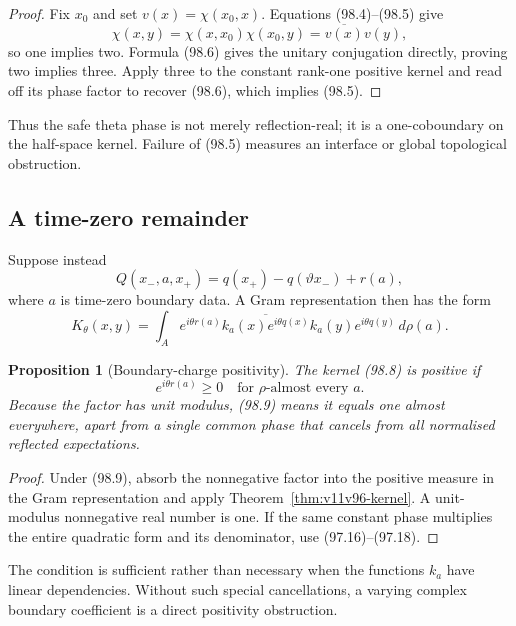 \documentclass[11pt]{article}
\newtheorem{proposition}[theorem]{Proposition}
\begin{document}
\begin{proof}
Fix \(x_0\) and set \(v(x)=\chi(x_0,x)\).  Equations
(98.4)--(98.5) give
\[
 \chi(x,y)=\chi(x,x_0)\chi(x_0,y)
          =\overline{v(x)}v(y),
\]
so one implies two.  Formula (98.6) gives the unitary conjugation
directly, proving two implies three.  Apply three to the constant
rank-one positive kernel and read off its phase factor to recover
(98.6), which implies (98.5).
\end{proof}

Thus the safe theta phase is not merely reflection-real; it is a
one-coboundary on the half-space kernel.  Failure of (98.5) measures
an interface or global topological obstruction.

\subsection{A time-zero remainder}

Suppose instead
\[
 Q(x_-,a,x_+)
 =q(x_+)-q(\vartheta x_-)+r(a),                              \tag{98.7}
\]
where \(a\) is time-zero boundary data.  A Gram representation then
has the form
\[
 K_\theta(x,y)
 =\int_A e^{i\theta r(a)}
        \overline{k_a(x)e^{i\theta q(x)}}
        k_a(y)e^{i\theta q(y)}\,d\rho(a).                   \tag{98.8}
\]

\begin{proposition}[Boundary-charge positivity]
\label{prop:v11v98-boundary}
The kernel (98.8) is positive if
\[
                              e^{i\theta r(a)}\ge0
                    \quad\text{for }\rho\text{-almost every }a.
                                                                    \tag{98.9}
\]
Because the factor has unit modulus, (98.9) means it equals one almost
everywhere, apart from a single common phase that cancels from all
normalised reflected expectations.
\end{proposition}

\begin{proof}
Under (98.9), absorb the nonnegative factor into the positive measure
in the Gram representation and apply
Theorem~\ref{thm:v11v96-kernel}.  A unit-modulus nonnegative real
number is one.  If the same constant phase multiplies the entire
quadratic form and its denominator, use (97.16)--(97.18).
\end{proof}

The condition is sufficient rather than necessary when the functions
\(k_a\) have linear dependencies.  Without such special
cancellations, a varying complex boundary coefficient is a direct
positivity obstruction.
\end{document}
